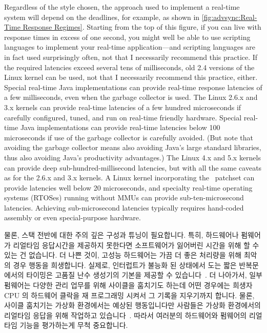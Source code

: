 Regardless of the style chosen, the approach used to implement a real-time
system will depend on the deadlines, for example, as shown in
\cref{fig:advsync:Real-Time Response Regimes}.
Starting from the top of this figure, if you can live with response times in
excess of one second, you might well be able to use scripting languages
to implement your real-time application---and scripting languages are
in fact used surprisingly often, not that I necessarily recommend this
practice.
If the required latencies exceed several tens of milliseconds,
old 2.4 versions of the Linux kernel can be used, not that I necessarily
recommend this practice, either.
Special real-time Java implementations can provide real-time response
latencies of a few milliseconds, even when the garbage collector is
used.
The Linux 2.6.x and 3.x kernels can provide real-time latencies of
a few hundred microseconds if carefully configured, tuned, and run
on real-time friendly hardware.
Special real-time Java implementations can provide real-time latencies
below 100 microseconds if use of the garbage collector is carefully avoided.
(But note that avoiding the garbage collector means also avoiding
Java's large standard libraries, thus also avoiding Java's productivity
advantages.)
The Linux 4.x and 5.x kernels can provide deep sub-hundred-millisecond
latencies, but with all the same caveats as for the 2.6.x and 3.x kernels.
A Linux kernel incorporating the \rt\ patchset can provide latencies
well below 20 microseconds, and specialty real-time operating systems (RTOSes)
running without MMUs can provide sub-ten-microsecond
latencies.
Achieving sub-microsecond latencies typically requires hand-coded assembly
or even special-purpose hardware.

\fi

물론, 스택 전반에 대한 주의 깊은 구성과 튜닝이 필요합니다.
특히, 하드웨어나 펌웨어가 리얼타임 응답시간을 제공하지 못한다면 소프트웨어가
잃어버린 시간을 위해 할 수 있는 건 없습니다.
더 나쁜 것이, 고성능 하드웨어는 가끔 더 좋은 처리량을 위해 최악의 경우 행동을
희생합니다.
실제로, 인터럽트가 불능화 된 상태에서 도는 짧은 반복문에서의 타이밍은 고품질
난수 생성기의 기본을 제공할 수
있습니다~\cite{PeterOkech2009InherentRandomness}.
더 나아가서, 일부 펌웨어는 다양한 관리 업무를 위해 사이클을 훔치기도 하는데
어떤 경우에는 희생자 CPU 의 하드웨어 클락을 재 프로그래밍 시켜서 그 기록을
지우기까지 합니다.
물론, 사이클 훔치기는 가상화 환경에서는 예상된 행동입니다만 사람들은 가상화
환경에서의 리얼타임 응답을 위해 작업하고
있습니다~\cite{ThomasGleixner2012KVMrealtime,JanKiszka2014virtRT}.
따라서 여러분의 하드웨어와 펌웨어의 리얼타임 기능을 평가하는게 무척 중요합니다.

